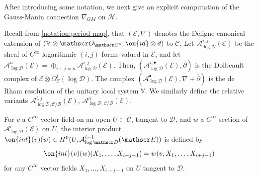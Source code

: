 After introducing some notation, we next give an explicit computation of the Gauss-Manin connection $\nabla_{GM}$ on $\mathscr{H}$.

\begin{notation}
\notready
	\label{notation:}
	Recall from \autoref{notation:period-map}, that $(\mathscr E, \nabla)$ denotes the Deligne canonical extension of
$(\mathbb V \otimes \mathscr O_{\mathscr C^\circ}, \on{id} \otimes d)$ to
$\mathscr C$.
	Let $\mathcal{A}^{i,j}_{\log \mathscr{D}}(\mathscr{E})$ be the sheaf of $C^\infty$ logarithmic $(i,j)$-forms valued in $\mathscr{E}$, and let $\mathcal{A}^n_{\log \mathscr{D}}(\mathscr{E})=\oplus_{i+j=n} \mathcal{A}^{i,j}_{\log \mathscr{D}}(\mathscr{E})$.
	Then, $(\mathcal{A}^{i,\bullet}_{\log\mathscr{D}}(\mathscr{E}),
	\overline{\partial})$ is the Dolbeault complex of $\mathscr{E}\otimes
	\Omega^i_{\mathscr{C}}(\log \mathscr D)$. The complex
	$(\mathcal{A}^\bullet_{\log \mathscr{D}}(\mathscr{E}),
	\nabla+\overline{\partial})$ is the de Rham resolution of the unitary
	local system $\mathbb{V}$. We similarly define the relative variants  $\mathcal{A}^{i,j}_{\log \mathscr{D}, \mathscr{C}/\mathscr{B}}(\mathscr{E})$, $\mathcal{A}^{n}_{\log \mathscr{D}, \mathscr{C}/\mathscr{B}}(\mathscr{E})$.
\end{notation}
\begin{notation}
\notready
	\label{notation:}
	For $v$ a $C^\infty$ vector field on an open $U \subset \mathscr C$, tangent to $\mathscr{D}$, and
$w$ a $C^\infty$ section of $\mathcal{A}^i_{\log \mathscr{D}}(\mathscr{E})$ on $U$, the interior product
$\on{int}(v)(w) \in H^0(U, \mathcal{A}^{i-1}_{\log \mathscr D}(\mathscr E))$ is
defined by
$$\on{int}(v)(w)(X_1, \ldots, X_{i+j-1}) = w(v, X_1, \ldots, X_{i+j-1})$$ for any
$C^\infty$ vector fields $X_1, \ldots, X_{i+j-1}$ on $U$ tangent to $\mathscr{D}$.
\end{notation}

